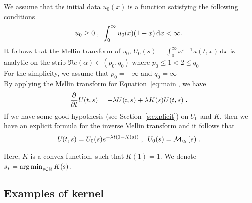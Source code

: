 \documentclass[11pt]{amsart}
\renewcommand{\Re}{\mathfrak{R}e}
\newcommand{\diff}{\,\mathrm{d}}
\begin{document}
We assume that the initial data $u_0(x)$ is a function satisfying the following conditions 
$$ u_0 \geq 0 \eqsepv \int_0^\infty u_0(x)(1+x)\diff x < \infty.$$
It follows that the Mellin transform of $u_0$, $U_0(s)= \int_0^\infty x^{s-1}u(t,x)\diff x$ is analytic on the strip $\Re(\alpha) \in (p_0,q_0)$ where $p_0 \leq 1 < 2 \leq q_0$ \\
For the simplicity, we assume that 
$ p_0=-\infty$ and $q_0 = \infty$\\

By applying the Mellin transform for Equation~\eqref{eq:main}, we have
	\begin{equation}
		\frac{\partial}{\partial t} U(t,s) = - \lambda U(t,s) + \lambda K(s) U(t,s)
		\; .
        \label{eq:explicit_reconstruction}
	\end{equation}
If we have some good hypothesis (see Section~\ref{s:explicit}) on $U_0$ and $K$, then we have an explicit formula for the inverse Mellin transform and it follows that
    \begin{equation*}
        U(t,s) = U_0(s) e^{-\lambda t(1 - K(s) ) }
        \; , \enspace
        U_0(s) = \mathcal{M}_{u_0}(s)
        \; .
    \end{equation*}

Here, $K$ is a convex function, such that $K(1) = 1$. We denote $s_* = \mathop{\arg\min}_{s\in \mathbb{R}} K(s)$. 

\subsection{Examples of kernel}
\end{document}
